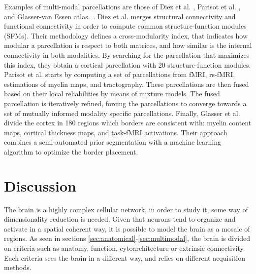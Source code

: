 Examples of multi-modal parcellations are those of Diez et al. \cite{Diez2014},
Parisot et al. \cite{Parisot2017}, and Glasser-van Essen atlas.~\cite{Glasser2016}. 
Diez et al. \cite{Diez2014} merges structural connectivity and functional
connectivity in order to compute common structure-function modules (SFMs).
Their methodology defines a cross-modularity index, that indicates how
modular a parcellation is respect to both matrices, and how similar is the
internal connectivity in both modalities. By searching for the parcellation
that maximizes this index, they obtain a cortical parcellation with 20 structure-function
modules. Parisot et al. \cite{Parisot2017} starts by computing a set of
parcellations from fMRI, rs-fMRI, estimations of myelin maps, and tractography.
These parcellations are then fused based on their local reliabilities by means of
mixture models. The fused parcellation is iteratively refined, forcing 
the parcellations to converge towards a set of mutually informed modality specific
parcellations. Finally, Glasser et al.~\cite{Glasser2016}
divide the cortex in 180 regions which borders are consistent with: 
myelin content maps, cortical thickness maps, and task-fMRI activations. Their
approach combines a semi-automated prior segmentation with a machine learning
algorithm to optimize the border placement.

\section{Discussion}

The brain is a highly complex cellular network, in order to study it, some
way of dimensionality reduction is needed. Given that neurons tend to organize
and activate in a spatial coherent way, it is possible to model the brain as a
mosaic of regions. As seen in sections \ref{sec:anatomical}-\ref{sec:multimodal},
the brain is divided on criteria such as anatomy, function, cytoarchitecture or
extrinsic connectivity. Each criteria sees the brain in a different way, and
relies on different acquisition methods. 

